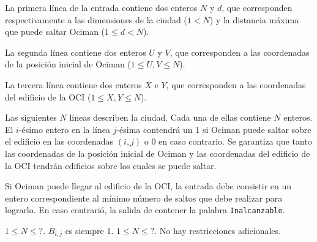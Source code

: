\documentclass{oci}
\begin{document}
\begin{inputDescription}
La primera línea de la entrada contiene dos enteros $N$ y $d$, que corresponden
respectivamente a las dimensiones de la ciudad ($1 < N$) y la distancia máxima
que puede saltar Ociman ($1 \le d < N$).

La segunda línea contiene dos enteros $U$ y $V$, que corresponden a las
coordenadas de la posición inicial de Ociman ($1 \le U, V \le N$). 

La tercera línea contiene dos enteros $X$ e $Y$, que corresponden a las
coordenadas del edificio de la OCI ($1 \le X, Y \le N$). 

Las siguientes $N$ líneas describen la ciudad.
Cada una de ellas contiene $N$ enteros.
El $i$-ésimo entero en la línea $j$-ésima contendrá un 1 si Ociman puede saltar
sobre el edificio en las coordenadas $(i, j)$ o 0 en caso contrario.
Se garantiza que tanto las coordenadas de la posición inicial de Ociman y las
coordenadas del edificio de la OCI tendrán edificios sobre los cuales se
puede saltar.
\end{inputDescription}

\begin{outputDescription}
Si Ociman puede llegar al edificio de la OCI, la entrada debe consistir
en un entero correspondiente al mínimo número de saltos que debe realizar para
lograrlo.
En caso contrarió, la salida de contener la palabra \verb-Inalcanzable-.
\end{outputDescription}

\begin{scoreDescription}
   $1 \le N \le ?$. $B_{i,j}$ es siempre 1.
   $1 \le N \le ?$. No hay restricciones adicionales.
\end{scoreDescription}

\begin{sampleDescription}
\end{sampleDescription}
\end{document}
